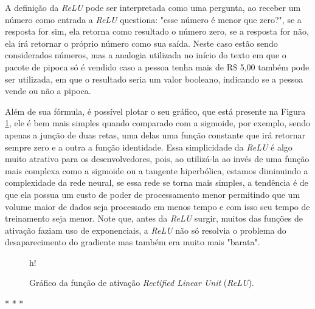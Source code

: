 A definição da \textit{ReLU} pode ser interpretada como uma pergunta, ao receber um número como entrada a \textit{ReLU} questiona: "esse número é menor que zero?", se a resposta for sim, ela retorna como resultado o número zero, se a resposta for não, ela irá retornar o próprio número como sua saída. Neste caso estão sendo considerados números, mas a analogia utilizada no início do texto em que o pacote de pipoca só é vendido caso a pessoa tenha mais de R\$ 5,00 também pode ser utilizada, em que o resultado seria um valor booleano, indicando se a pessoa vende ou não a pipoca.

Além de sua fórmula, é possível plotar o seu gráfico, que está presente na Figura \ref{fig:relu}, ele é bem mais simples quando comparado com a sigmoide, por exemplo, sendo apenas a junção de duas retas, uma delas uma função constante que irá retornar sempre zero e a outra a função identidade. Essa simplicidade da \textit{ReLU} é algo muito atrativo para os desenvolvedores, pois, ao utilizá-la ao invés de uma função mais complexa como a sigmoide ou a tangente hiperbólica, estamos diminuindo a complexidade da rede neural, se essa rede se torna mais simples, a tendência é de que ela possua um custo de poder de processamento menor permitindo que um volume maior de dados seja processado em menos tempo e com isso seu tempo de treinamento seja menor. Note que, antes da \textit{ReLU} surgir, muitos das funções de ativação faziam uso de exponenciais, a \textit{ReLU} não só resolvia o problema do desaparecimento do gradiente mas também era muito mais "barata".

\begin{figure}{h!}
    \centering
    \caption{Gráfico da função de ativação \textit{Rectified Linear Unit} (\textit{ReLU}).}
    \label{fig:relu}
\end{figure}

\medskip
\begin{center}
 * * *
\end{center}
\medskip

